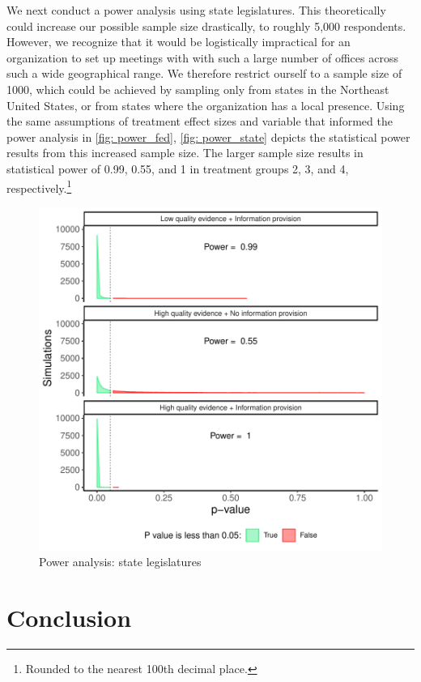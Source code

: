 \documentclass[12pt,final,fleqn]{article}
\theoremstyle{plain}
\begin{document}
We next conduct a power analysis using state legislatures. This theoretically could increase our possible sample size drastically, to roughly 5,000 respondents. However, we recognize that it would be logistically impractical for an organization to set up meetings with with such a large number of offices across such a wide geographical range. We therefore restrict ourself to a sample size of 1000, which could be achieved by sampling only from states in the Northeast United States, or from states where the organization has a local presence. Using the same assumptions of treatment effect sizes and variable that informed the power analysis in \autoref{fig: power_fed}, \autoref{fig: power_state} depicts the statistical power results from this increased sample size. The larger sample size results in statistical power of 0.99, 0.55, and 1 in treatment groups 2, 3, and 4, respectively.\footnote{Rounded to the nearest 100th decimal place.}

\begin{figure}[!htb]
\includegraphics{../figs/power_state.pdf}
\bigbreak
\caption{Power analysis: state legislatures}
\label{fig: power_state}
\end{figure}



\section{Conclusion} \label{sec:Conclusion}
\end{document}

